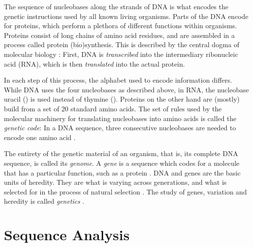 
The sequence of nucleobases along the strands of DNA is what encodes the genetic instructions
used by all known living organisms.
Parts of the DNA encode for proteins,
which perform a plethora of different functions within organisms.
Proteins consist of long chains of amino acid residues, and
are assembled in a process called protein (bio)synthesis.
This is described by the central dogma of molecular biology \cite{Crick1958,Crick1970}:
First, DNA is \emph{transcribed} into the intermediary ribonucleic acid (RNA),
which is then \emph{translated} into the actual protein.

In each step of this process, the alphabet used to encode information differs.
While DNA uses the four nucleobases as described above,
in RNA, the nucleobase uracil () is used instead of thymine ().
Proteins on the other hand are (mostly) build from a set of \num{20} standard amino acids.
The set of rules used by the molecular machinery for translating nucleobases into amino acids
is called the \emph{genetic code}:
In a DNA sequence, three consecutive nucleobases are needed to encode one amino acid \cite{Shu2017}.

The entirety of the genetic material of an organism, that is, its complete DNA sequence, is called its \emph{genome}.
A \emph{gene} is a sequence which codes for a molecule that has a particular function, such as a protein \cite{Gericke2007}.
DNA and genes are the basic units of heredity.
They are what is varying across generations,
and what is selected for in the process of natural selection \cite{Dawkins1989}.
The study of genes, variation and heredity is called \emph{genetics} \cite{Griffiths2000}.


\section{Sequence Analysis}
\label{ch:Foundations:sec:SequenceAnalysis}

